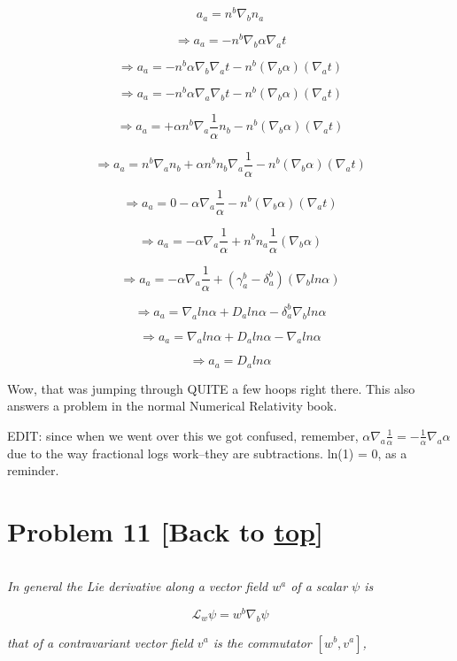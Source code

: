\documentclass[landscape,letterpaper,10pt,english]{article}
\begin{document}
\[ a_a = n^b \nabla_b n_a \]

\[ \Rightarrow a_a = - n^b \nabla_b \alpha \nabla_a t \]

\[ \Rightarrow a_a = - n^b \alpha \nabla_b \nabla_a t - n^b (\nabla_b \alpha) (\nabla_a t)   \]

\[ \Rightarrow a_a = - n^b \alpha \nabla_a \nabla_b t - n^b (\nabla_b \alpha) (\nabla_a t)   \]

\[ \Rightarrow a_a = + \alpha n^b \nabla_a \frac1\alpha n_b - n^b (\nabla_b \alpha) (\nabla_a t)   \]

\[ \Rightarrow a_a = n^b \nabla_a n_b + \alpha n^b n_b \nabla_a \frac1\alpha - n^b (\nabla_b \alpha) (\nabla_a t)   \]

\[ \Rightarrow a_a = 0 - \alpha \nabla_a \frac1\alpha - n^b (\nabla_b \alpha) (\nabla_a t)   \]

\[ \Rightarrow a_a = - \alpha \nabla_a \frac1\alpha + n^b n_a \frac1\alpha (\nabla_b \alpha)    \]

\[ \Rightarrow a_a = - \alpha \nabla_a \frac1\alpha + (\gamma^b_a - \delta^b_a) (\nabla_b ln \alpha)    \]

\[ \Rightarrow a_a = \nabla_a ln\alpha + D_a ln\alpha - \delta^b_a \nabla_b ln \alpha    \]

\[ \Rightarrow a_a = \nabla_a ln\alpha + D_a ln\alpha - \nabla_a ln \alpha    \]

\[ \Rightarrow a_a = D_a ln\alpha \]

Wow, that was jumping through QUITE a few hoops right there. This also
answers a problem in the normal Numerical Relativity book.

EDIT: since when we went over this we got confused, remember,
\(\alpha \nabla_a \frac1\alpha = - \frac1\alpha \nabla_a \alpha\) due to
the way fractional logs work--they are subtractions. ln(1) = 0, as a
reminder.

    \hypertarget{problem-11-back-to-top}{%
\section{\texorpdfstring{Problem 11 {[}Back to
\hyperref[toc]{top}{]}}{Problem 11 {[}Back to {]}}}\label{problem-11-back-to-top}}

\[\label{P11}\]

\emph{In general the Lie derivative along a vector field \(w^a\) of a
scalar \(\psi\) is}

\[ \mathcal{L}_w \psi = w^b \nabla_b \psi \]

\emph{that of a contravariant vector field \(v^a\) is the commutator
\([w^b,v^a]\),}
\end{document}
